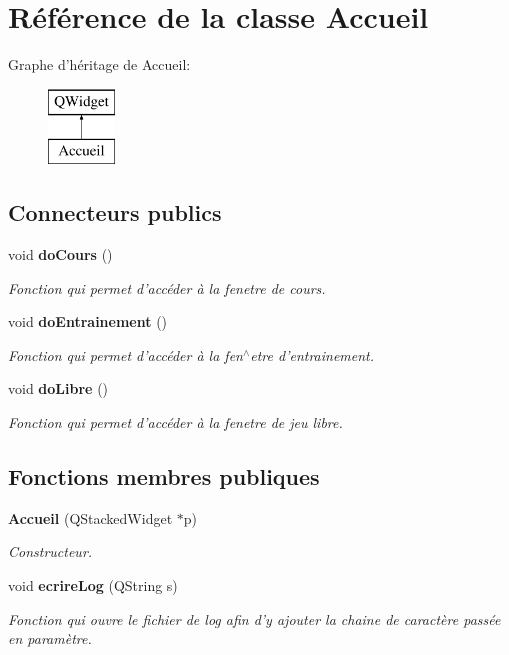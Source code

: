 \section{Référence de la classe Accueil}
\label{class_accueil}
Graphe d'héritage de Accueil\-:\begin{figure}[H]
\begin{center}
\leavevmode
\includegraphics[height=2.000000cm]{class_accueil}
\end{center}
\end{figure}
\subsection*{Connecteurs publics}
\begin{DoxyCompactItemize}
\item 
void {\bf do\-Cours} ()
\begin{DoxyCompactList}\small\item\em Fonction qui permet d'accéder à la fenetre de cours. \end{DoxyCompactList}\item 
void {\bf do\-Entrainement} ()
\begin{DoxyCompactList}\small\item\em Fonction qui permet d'accéder à la fen$^\wedge$etre d'entrainement. \end{DoxyCompactList}\item 
void {\bf do\-Libre} ()
\begin{DoxyCompactList}\small\item\em Fonction qui permet d'accéder à la fenetre de jeu libre. \end{DoxyCompactList}\end{DoxyCompactItemize}
\subsection*{Fonctions membres publiques}
\begin{DoxyCompactItemize}
\item 
{\bf Accueil} (Q\-Stacked\-Widget $\ast$p)
\begin{DoxyCompactList}\small\item\em Constructeur. \end{DoxyCompactList}\item 
void {\bf ecrire\-Log} (Q\-String s)
\begin{DoxyCompactList}\small\item\em Fonction qui ouvre le fichier de log afin d'y ajouter la chaine de caractère passée en paramètre. \end{DoxyCompactList}\end{DoxyCompactItemize}


